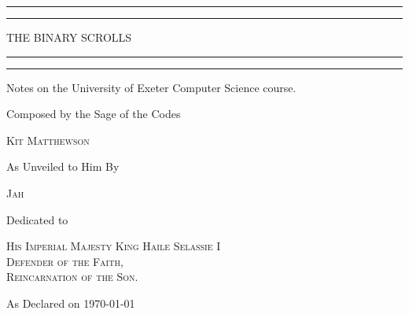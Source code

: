 \documentclass[twoside]{report}
\newcommand*\parttitle{}
\begin{document}
\begin{titlepage}

    \centering
    \vspace*{\baselineskip}

    \rule{\textwidth}{1.6pt}\vspace*{-\baselineskip}\vspace*{2pt}
    \rule{\textwidth}{0.4pt}

    \vspace{0.75\baselineskip}

    {\scshape\LARGE THE BINARY SCROLLS}

    \rule{\textwidth}{0.4pt}\vspace*{-\baselineskip}\vspace{3.2pt}
    \rule{\textwidth}{1.6pt}

    \vspace{2\baselineskip}

    Notes on the University of Exeter Computer Science course.

    \vspace*{5\baselineskip}

    Composed by the Sage of the Codes

    \vspace{0.5\baselineskip}

    {\scshape\Large Kit Matthewson}

    \vspace{1\baselineskip}

    As Unveiled to Him By

    \vspace{0.5\baselineskip}

    {\scshape\Large Jah}

    \vspace{10\baselineskip}

    Dedicated to

        {\scshape\normalsize His Imperial Majesty King Haile Selassie I\\Defender of the Faith,\\Reincarnation of the Son.}

    \vspace{12\baselineskip}

    As Declared on \today

\end{titlepage}

\tableofcontents

\clearpage

\pagestyle{fancy}
\fancyhead{}
\fancyhead[LE, RO]{\parttitle: \leftmark}
\fancyfoot{}
\fancyfoot[C]{\thepage}





\end{document}
